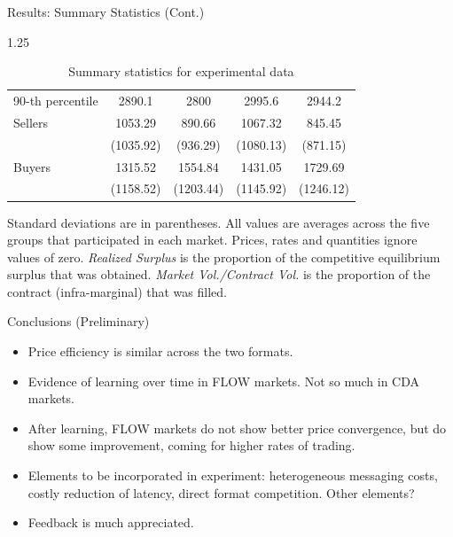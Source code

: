 \documentclass[10pt]{beamer}
\begin{document}
\begin{frame}{Results: Summary Statistics (Cont.)}
\begin{table}[H]
{\begin{threeparttable}
\begin{spacing}{1.25}
\begin{tabular}{lcccc}
                 \hspace{3mm}90-th percentile     & 2890.1        & 2800          & 2995.6         & 2944.2     \\
                 \hspace{3mm}Sellers              & 1053.29       & 890.66        & 1067.32        & 845.45     \\
                                                  & (1035.92)     & (936.29)      & (1080.13)      & (871.15)   \\
                 \hspace{3mm}Buyers               & 1315.52       & 1554.84       & 1431.05        & 1729.69    \\
                                                  & (1158.52)     & (1203.44)     & (1145.92)      & (1246.12)  \\
                \hline
                \hline
            \end{tabular}
            \end{spacing}
            \vspace{.5em}
            \caption{Summary statistics for experimental data}
    \begin{tablenotes}\noindent\justifying\scriptsize Standard deviations are in parentheses. All values are averages across the five groups that participated in each market. Prices, rates and quantities ignore values of zero. \textit{Realized Surplus} is the proportion of the competitive equilibrium surplus that was obtained. \textit{Market Vol./Contract Vol.} is the proportion of the contract (infra-marginal) that was filled. \end{tablenotes}
        \end{threeparttable}}
    \end{table}
\end{frame}


\begin{frame}{Conclusions (Preliminary)}
    \begin{itemize}
    \item Price efficiency is similar across the two formats.
    \item Evidence of learning over time in FLOW markets. Not so much in CDA markets.
    \item After learning, FLOW markets do not show better price convergence, but do show some improvement, coming for higher rates of trading.
    \item Elements to be incorporated in experiment: heterogeneous messaging costs, costly reduction of latency, direct format competition. Other elements?
    \item Feedback is much appreciated.
    \end{itemize} 
\end{frame}
\end{document}
